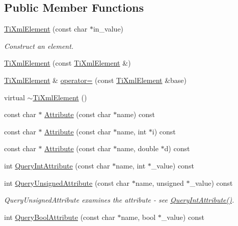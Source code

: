 \subsection*{Public Member Functions}
\begin{DoxyCompactItemize}
\item 
\hyperlink{class_ti_xml_element_a01bc3ab372d35da08efcbbe65ad90c60}{Ti\+Xml\+Element} (const char $\ast$in\+\_\+value)
\begin{DoxyCompactList}\small\item\em Construct an element. \end{DoxyCompactList}\item 
\hyperlink{class_ti_xml_element_a1ca4465f3c2eac6a60e641cd7f1d9f7e}{Ti\+Xml\+Element} (const \hyperlink{class_ti_xml_element}{Ti\+Xml\+Element} \&)
\item 
\hyperlink{class_ti_xml_element}{Ti\+Xml\+Element} \& \hyperlink{class_ti_xml_element_ad58d300f4cfc0016ffa6861ebb718a0b}{operator=} (const \hyperlink{class_ti_xml_element}{Ti\+Xml\+Element} \&base)
\item 
virtual \hyperlink{class_ti_xml_element_aa049a47c5081c0d021968666360da261}{$\sim$\+Ti\+Xml\+Element} ()
\item 
const char $\ast$ \hyperlink{class_ti_xml_element_ac1e4691e9375ba4e665dce7e46a50a9c}{Attribute} (const char $\ast$name) const 
\item 
const char $\ast$ \hyperlink{class_ti_xml_element_aa9192e80567b5042dbded80b78c44339}{Attribute} (const char $\ast$name, int $\ast$i) const 
\item 
const char $\ast$ \hyperlink{class_ti_xml_element_aec4f727f8aa49b51248d80125d173136}{Attribute} (const char $\ast$name, double $\ast$d) const 
\item 
int \hyperlink{class_ti_xml_element_aea0bfe471380f281c5945770ddbf52b9}{Query\+Int\+Attribute} (const char $\ast$name, int $\ast$\+\_\+value) const 
\item 
int \hyperlink{class_ti_xml_element_ae48df644f890ab86fa19839ac401f00d}{Query\+Unsigned\+Attribute} (const char $\ast$name, unsigned $\ast$\+\_\+value) const 
\begin{DoxyCompactList}\small\item\em Query\+Unsigned\+Attribute examines the attribute -\/ see \hyperlink{class_ti_xml_element_aea0bfe471380f281c5945770ddbf52b9}{Query\+Int\+Attribute()}. \end{DoxyCompactList}\item 
int \hyperlink{class_ti_xml_element_af4a1d3f88c28eb0f3115dc39ebd83fff}{Query\+Bool\+Attribute} (const char $\ast$name, bool $\ast$\+\_\+value) const 

\end{DoxyCompactItemize}
